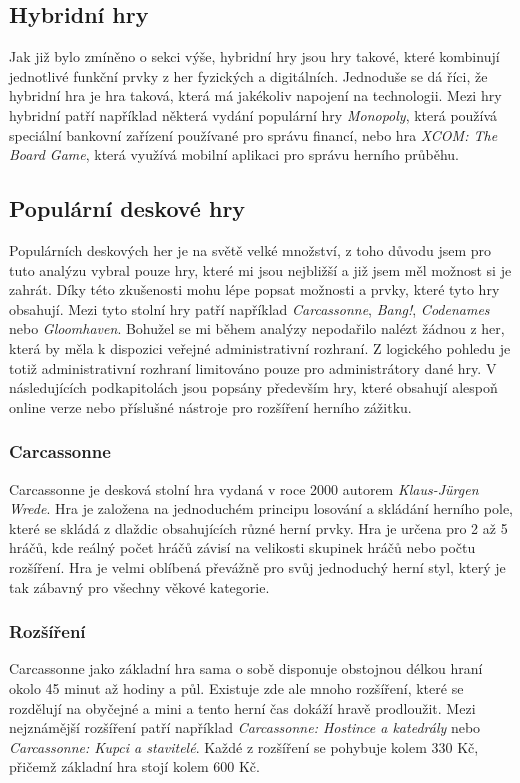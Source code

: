 \subsection*{Hybridní hry}
\label{subsec:popular-board-games-analysis-hybrid-games}
Jak již bylo zmíněno o sekci výše, hybridní hry jsou hry takové, které kombinují jednotlivé funkční prvky z her fyzických a digitálních. Jednoduše se dá říci, že hybridní hra je hra taková, která má jakékoliv napojení na technologii. Mezi hry hybridní patří například některá vydání populární hry \textit{Monopoly}, která používá speciální bankovní zařízení používané pro správu financí, nebo hra \textit{XCOM: The Board Game}, která využívá mobilní aplikaci pro správu herního průběhu.

\subsection{Populární deskové hry}
\label{subsec:popular-board-games-analysis-popular-games}
Populárních deskových her je na světě velké množství, z toho důvodu jsem pro tuto analýzu vybral pouze hry, které mi jsou nejbližší a již jsem měl možnost si je zahrát. Díky této zkušenosti mohu lépe popsat možnosti a prvky, které tyto hry obsahují. Mezi tyto stolní hry patří například \textit{Carcassonne}, \textit{Bang!}, \textit{Codenames} nebo \textit{Gloomhaven}. Bohužel se mi během analýzy nepodařilo nalézt žádnou z her, která by měla k dispozici veřejné administrativní rozhraní. Z logického pohledu je totiž administrativní rozhraní limitováno pouze pro administrátory dané hry. V následujících podkapitolách jsou popsány především hry, které obsahují alespoň online verze nebo příslušné nástroje pro rozšíření herního zážitku.

\subsubsection{Carcassonne}
\label{subsubsec:popular-board-games-analysis-carcassonne}
Carcassonne je desková stolní hra vydaná v roce 2000 autorem \textit{Klaus-Jürgen Wrede}. Hra je založena na jednoduchém principu losování a skládání herního pole, které se skládá z dlaždic obsahujících různé herní prvky. Hra je určena pro 2 až 5 hráčů, kde reálný počet hráčů závisí na velikosti skupinek hráčů nebo počtu rozšíření. Hra je velmi oblíbená převážně pro svůj jednoduchý herní styl, který je tak zábavný pro všechny věkové kategorie.

\subsubsection*{Rozšíření}
\label{subsubsec:popular-board-games-analysis-carcassonne-expansions}
Carcassonne jako základní hra sama o sobě disponuje obstojnou délkou hraní okolo 45 minut až hodiny a půl. Existuje zde ale mnoho rozšíření, které se rozdělují na obyčejné a mini a tento herní čas dokáží hravě prodloužit. Mezi nejznámější rozšíření patří například \textit{Carcassonne: Hostince a katedrály} nebo \textit{Carcassonne: Kupci a stavitelé}. Každé z rozšíření se pohybuje kolem 330 Kč, přičemž základní hra stojí kolem 600 Kč.


